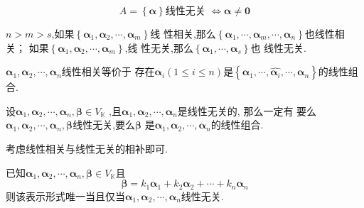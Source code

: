\begin{green}
\begin{corollary}[仅一个向量的向量组]\label{cor:仅一个向量的向量组}
    \[
    A = \left\{\bm{\alpha}\right\} \text{
        线性无关
    } \Longleftrightarrow 
    \bm{\alpha} \neq \bm{0}
    \]
\end{corollary}
\end{green}
\begin{formal}
\begin{theorem}[向量组的大小关系]\label{thm:向量组的大小关系}
    $n > m > s$,如果$\left\{\bm{\alpha}_1
    ,\bm{\alpha}_2,\cdots,\bm{\alpha}_m\right\}$线
    性相关,那么$\left\{\bm{\alpha}_1,
    \cdots,\bm{\alpha}_m,\cdots,
    \bm{\alpha}_n\right\}$也线性相关；
    如果$\left\{\bm{\alpha}_1,\bm{\alpha}_2
    ,\cdots,\bm{\alpha}_m\right\}$,线
    性无关,那么$\left\{\bm{\alpha}_1,
    \cdots,\bm{\alpha}_s\right\}$也
    线性无关.
\end{theorem}
\end{formal}
\begin{green}
\begin{corollary}[余向量表示]\label{cor:余向量表示}
    $\bm{\alpha}_1,\bm{\alpha}_2,\cdots,
    \bm{\alpha}_n$线性相关等价于
    存在$\bm{\alpha}_i\left(
        1 \leqslant i
        \leqslant n
    \right)$是$\left\{
        \bm{\alpha}_1,\cdots
        ,\widehat{\bm{\alpha}_i},
        \cdots,\bm{\alpha}_n
    \right\}$的线性组合.
\end{corollary}
\end{green}
\begin{green}
\begin{corollary}[加入向量的线性关系]\label{cor:加入向量的线性关系}
    设$\bm{\alpha}_1,\bm{\alpha}_2,\cdots,
    \bm{\alpha}_n,\bm{\beta}
    \in  V_{\mathbb{K}}$
    ,且$\bm{\alpha}_1,\bm{\alpha}_2,\cdots
    ,\bm{\alpha}_n$是线性无关的,
    那么一定有
    要么$\bm{\alpha}_1,\bm{\alpha}_2,\cdots,
    \bm{\alpha}_n,\bm{\beta}
    $线性无关,要么$\bm{\beta}$
    是$\bm{\alpha}_1,\bm{\alpha}_2,\cdots,
    \bm{\alpha}_n$的线性组合.
\end{corollary}
\begin{Proof}
考虑线性相关与线性无关的相补即可.
\end{Proof}
\end{green}
\begin{formal}
\begin{theorem}[线性表示唯一]\label{thm:线性表示唯一}
    已知$\bm{\alpha}_1,\bm{\alpha}_2,\cdots,
    \bm{\alpha}_n,\bm{\beta}
    \in  V_{\mathbb{K}}$且
    \[
    \bm{\beta} = k_1\bm{\alpha}_1+k_2\bm{\alpha}_2
    +\cdots+k_n\bm{\alpha}_n
    \]
    则该表示形式唯一当且仅当$\bm{\alpha}_1,\bm{\alpha}_2,\cdots,\bm{\alpha}_n$线性无关.
\end{theorem}\end{formal}
